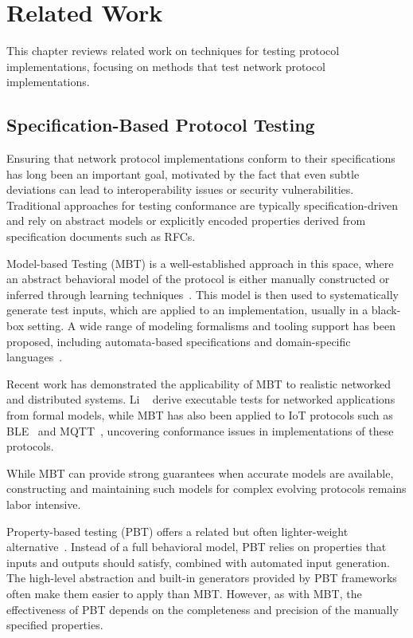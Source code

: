 \chapter{Related Work}\label{chapter:related}
This chapter reviews related work on techniques for testing protocol implementations, focusing on methods that test network protocol implementations.

\section{Specification-Based Protocol Testing}
Ensuring that network protocol implementations conform to their specifications has long been an important goal, motivated by the fact that even subtle deviations can lead to interoperability issues or security vulnerabilities.
Traditional approaches for testing conformance are typically specification-driven and rely on abstract models or explicitly encoded properties derived from specification documents such as RFCs.

Model-based Testing (MBT) is a well-established approach in this space, where an abstract behavioral model of the protocol is either manually constructed or inferred through learning techniques~\cite{MBT-reactive@2005,Utting:mbt@2006,Tappler@ICST-2017}.
This model is then used to systematically generate test inputs, which are applied to an implementation, usually in a black-box setting.
A wide range of modeling formalisms and tooling support has been proposed, including automata-based specifications and domain-specific languages~\cite{Veanes:specexplorer,McMillan:sigcomm19}.

Recent work has demonstrated the applicability of MBT to realistic networked and distributed systems.
Li \etal~\cite{LiMBT@ISSTA21} derive executable tests for networked applications from formal models, while MBT has also been applied to IoT protocols such as BLE~\cite{MBT-IoT@FMICS22} and MQTT~\cite{MBT-MQTT@KBSE20}, uncovering conformance issues in implementations of these protocols.

While MBT can provide strong guarantees when accurate models are available, constructing and maintaining such models for complex evolving protocols remains labor intensive.

Property-based testing (PBT) offers a related but often lighter-weight alternative~\cite{ArtsQuviq@Erlang-06,PBT-SensorNetworks@SECON-15,TPBT@ISSTA-17, TPBT@ICST-18}.
Instead of a full behavioral model, PBT relies on properties that inputs and outputs should satisfy, combined with automated input generation.
The high-level abstraction and built-in generators provided by PBT frameworks often make them easier to apply than MBT.
However, as with MBT, the effectiveness of PBT depends on the completeness and precision of the manually specified properties.

